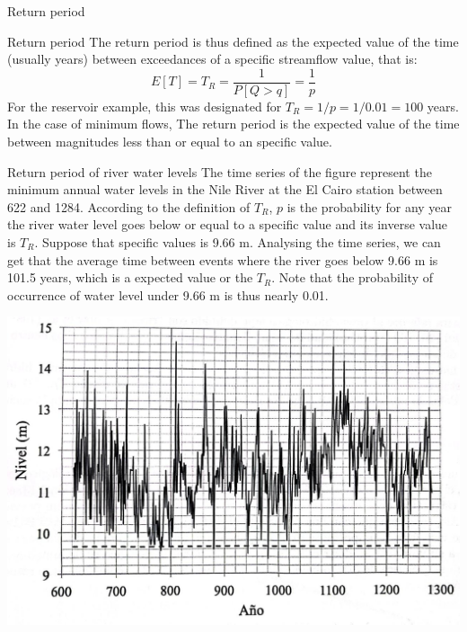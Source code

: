 \documentclass[8pt]{beamer}
\renewcommand{\emph}[1]{\textcolor{myorange}{#1}}
\begin{document}
\begin{frame}{Return period}
    \begin{block}{Return period}
        The \alert{return period} is thus defined as the expected value of the time (usually years) between exceedances of a specific streamflow value, that is:
        \[
            E[T] = T_R = \frac{1}{P[Q > q]} = \frac{1}{p}
        \]
        For the reservoir example, this was designated for  $T_R = 1/p = 1/0.01 = 100$ years. In the case of minimum flows, The \emph{return period} is the expected value of the time between magnitudes less than or equal to an specific value. 
   \end{block}

\begin{minipage}{0.57\textwidth}
 \begin{exampleblock}{Return period of river water levels} %
The time series of the figure represent the minimum annual water levels in the Nile River at the El Cairo station between 622 and 1284. According to the definition of $T_R$,  $p$ is the probability for any year the river water level goes below or equal to a specific value and its inverse value is $T_R$. Suppose that specific values is 9.66 m. Analysing the time series, we can get that the average time between events where the river goes below 9.66 m is 101.5 years, which is a expected value or  the $T_R$. Note that the probability of occurrence of water level under 9.66 m is thus nearly 0.01.
 \end{exampleblock}
\end{minipage}
\hfill
\begin{minipage}{0.4\textwidth}
\centering
\includegraphics[width=1.2\linewidth]{fiM21.jpeg}  %
\end{minipage}
\end{frame}
\end{document}
